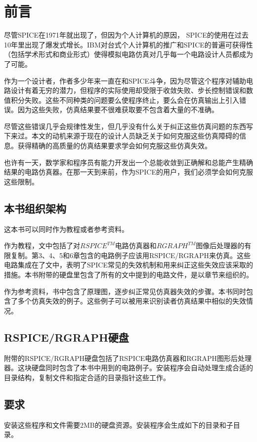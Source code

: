 \chapter*{前言}

尽管SPICE在1971年就出现了，但因为个人计算机的原因， SPICE的使用在过去10年里出现了爆发式增长。IBM对台式个人计算机的推广和SPICE的普遍可获得性（包括学术形式和商业形式）使得模拟电路仿真对几乎每一个电路设计人员都成为了可能。

作为一个设计者，作者多少年来一直在和SPICE斗争，因为尽管这个程序对辅助电路设计有着无穷的潜力，但程序的实际使用却受限于收敛失败、步长控制错误和数值积分失败。这些不同种类的问题要么使程序终止，要么会在仿真输出上引入错误。因为这些失败，仿真结果要不很难获取要不包含着大量的不准确。

尽管这些错误几乎会规律性发生，但几乎没有什么关于纠正这些仿真问题的东西写下来过。本文的动机来源于现在的设计人员缺乏关于如何克服这些仿真障碍的信息。获得精确的高质量的仿真结果要求学会如何克服这些仿真失效。

也许有一天，数学家和程序员有能力开发出一个总能收敛到正确解和总能产生精确结果的电路仿真器。在那一天到来前，作为SPICE的用户，我们必须学会如何克服这些限制。

\section{本书组织架构}
这本书可以同时作为教程或者参考资料。

作为教程，文中包括了对$RSPICE^{TM}$电路仿真器和$RGRAPH^{TM}$图像后处理器的有限复制。第3、4、5和6章包含的电路例子应该用RSPICE/RGRAPH来仿真。这些电路集成在了文中，表明了SPICE常见的失效机制和用来纠正这些失效应该采取的措施。本书附带的硬盘里包含了所有的文中提到的电路文件，是以章节来组织的。

作为参考资料，书中包含了原理图，逐步纠正常见仿真器失效的步骤。本书同时包含了多个仿真失效的例子。这些例子可以被用来识别读者仿真结果中相似的失效情况。

\section{RSPICE/RGRAPH硬盘}
附带的RSPICE/RGRAPH硬盘包括了RSPICE电路仿真器和RGRAPH图形后处理器。这块硬盘同时包含了本书中用到的电路例子。安装程序会自动处理生成合适的目录结构，复制文件和指定合适的目录指针这些工作。

\section{要求}
安装这些程序和文件需要2MB的硬盘资源。安装程序会生成如下的目录和子目录。

